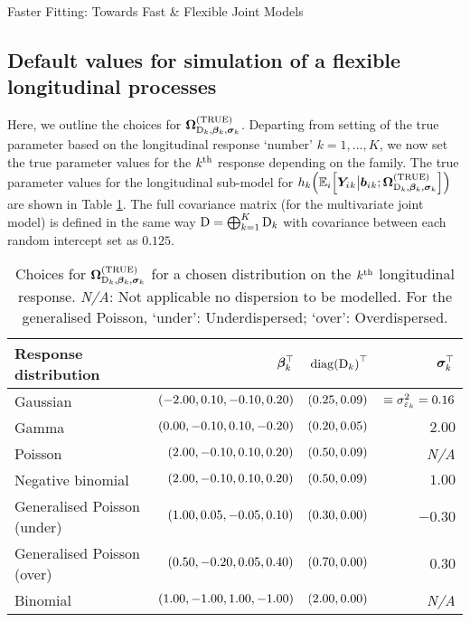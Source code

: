 \begin{chapter}{\label{cha:flexible}Faster Fitting: Towards Fast \& Flexible Joint Models}
\subsection{Default values for simulation of a flexible longitudinal processes}\label{sec:flexible-simsetup-proper}

Here, we outline the choices for $\bm{\mathrm{\Omega}}_{\mathrm{D}_k,\bm{\beta}_k,\bm{\sigma}_k}^{(\mathrm{TRUE})}$. Departing from setting of the true parameter based on the longitudinal response `number' $k=1,\dots,K$, we now set the true parameter values for the $k^{\text{th}}$ response depending on the family. The true parameter values for the longitudinal sub-model for $h_k\!\left(\mathbb{E}_i\!\left[\bm{Y}_i{_k}\big|\bm{b}_i{_k};\bm{\mathrm{\Omega}}_{\mathrm{D}_k,\bm{\beta}_k,\bm{\sigma}_k}^{(\mathrm{TRUE})}\right]\right)$ are shown in Table \ref{tab:flexible-sim-distrib}. The full covariance matrix (\ie for the multivariate joint model) is defined in the same way $\mathrm{D} = \bigoplus_{k=1}^K\mathrm{D}_k$ with covariance between each random intercept set as $0.125$. 

\begin{table}[ht]
\centering
{}
\captionsetup{font=scriptsize}
\begingroup\normalsize
\begin{tabular}{l|rrr}
  Response distribution & $\bm{\beta}_k^\top$ & $\mathrm{diag}\!\left(\mathrm{D}_k\right)^\top$ & $\bm{\sigma}_k^\top$ \\ 
  \hline
  Gaussian & $\!\left(-2.00, 0.10, -0.10, 0.20\right)$ & $\!\left(0.25, 0.09\right)$ & $\equiv\sigma_{\varepsilon_k}^2=0.16$\\
  Gamma & $\!\left(0.00, -0.10, 0.10, -0.20\right)$ & $\!\left(0.20, 0.05\right)$ & $2.00$\\
  Poisson & $\!\left(2.00,-0.10,0.10,0.20\right)$ & $\!\left(0.50, 0.09\right)$ & \textit{N/A}\\
  Negative binomial & $\!\left(2.00,-0.10,0.10,0.20\right)$ & $\!\left(0.50, 0.09\right)$ & $1.00$\\
  Generalised Poisson (under) & $\!\left(1.00, 0.05, -0.05, 0.10\right)$ & $\!\left(0.30, 0.00\right)$ & $-0.30$\\
  Generalised Poisson (over) & $\!\left(0.50, -0.20, 0.05, 0.40\right)$ & $\!\left(0.70, 0.00\right)$ & $0.30$\\
  Binomial & $\!\left(1.00,-1.00,1.00,-1.00\right)$ & $\!\left(2.00, 0.00\right)$ & \textit{N/A}\\
  \hline
\end{tabular}
\endgroup
\caption{Choices for $\bm{\mathrm{\Omega}}_{\mathrm{D}_k,\bm{\beta}_k,\bm{\sigma}_k}^{(\mathrm{TRUE})}$ for a chosen distribution on the $k^{\text{th}}$ longitudinal response. \textit{N/A}: Not applicable \ie no dispersion to be modelled. For the generalised Poisson, `under': Underdispersed; `over': Overdispersed.} 
\label{tab:flexible-sim-distrib}
\end{table}


\end{chapter}
